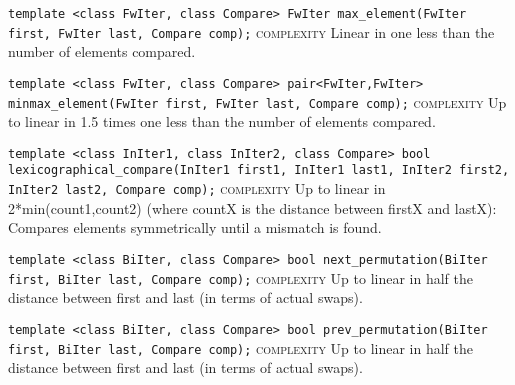 \noindent{}\hspace*{0.25em}\lstinline[basicstyle=\ttfamily\color{corange}]{template <class FwIter, class Compare> FwIter max_element(FwIter first, FwIter last, Compare comp);} \textsc{complexity} Linear in one less than the number of elements compared.\\\vspace{-0.6em}

\noindent{}\hspace*{0.25em}\lstinline[basicstyle=\ttfamily\color{corange}]{template <class FwIter, class Compare> pair<FwIter,FwIter> minmax_element(FwIter first, FwIter last, Compare comp);} \textsc{complexity} Up to linear in 1.5 times one less than the number of elements compared.\\\vspace{-0.6em}

\noindent{}\hspace*{0.25em}\lstinline[basicstyle=\ttfamily\color{corange}]{template <class InIter1, class InIter2, class Compare> bool lexicographical_compare(InIter1 first1, InIter1 last1, InIter2 first2, InIter2 last2, Compare comp);} \textsc{complexity} Up to linear in 2*min(count1,count2) (where countX is the distance between firstX and lastX): Compares elements symmetrically until a mismatch is found.\\\vspace{-0.6em}

\noindent{}\hspace*{0.25em}\lstinline[basicstyle=\ttfamily\color{corange}]{template <class BiIter, class Compare> bool next_permutation(BiIter first, BiIter last, Compare comp);} \textsc{complexity} Up to linear in half the distance between first and last (in terms of actual swaps).\\\vspace{-0.6em}

\noindent{}\hspace*{0.25em}\lstinline[basicstyle=\ttfamily\color{corange}]{template <class BiIter, class Compare> bool prev_permutation(BiIter first, BiIter last, Compare comp);} \textsc{complexity} Up to linear in half the distance between first and last (in terms of actual swaps).\\\vspace{-0.6em}
